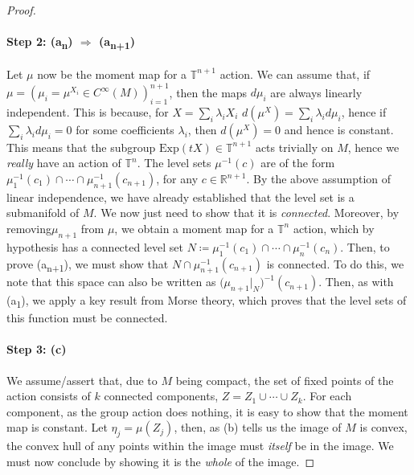 \documentclass[11pt, final]{article}
\begin{document}
\begin{proof}
	\paragraph{Step 2: (a\textsubscript{n}) $ \Rightarrow $ (a\textsubscript{n+1})} Let $ \mu $ now be the moment map for a $ \mathbb{T}^{n+1} $ action. We can assume that, if $ \mu = (\mu_i = \mu^{X_i} \in C^\infty (M))_{i=1}^{n+1} $, then the maps $ d\mu_i $ are always linearly independent. This is because, for $ X = \sum_i \lambda_i X_i $ $ d(\mu^X) = \sum_i \lambda_i d\mu_i $, hence if $ \sum_i \lambda_i d\mu_i = 0 $ for some coefficients $ \lambda_i $, then $ d(\mu^X) = 0 $ and hence is constant. This means that the subgroup $ \mathrm{Exp}( tX ) \in \mathbb{T}^{n+1}$ acts trivially on $ M $, hence we \textit{really} have an action of $ \mathbb{T}^n $. The level sets $ \mu^{-1}(c) $ are of the form $ \mu^{-1}_1(c_1) \cap \cdots \cap \mu^{-1}_{n+1}(c_{n+1}) $, for any $ c \in \mathbb{R}^{n+1} $. By the above assumption of linear independence, we have already established that the level set is a submanifold of $ M $. We now just need to show that it is \textit{connected}. Moreover, by removing$ \mu_{n+1} $ from $ \mu $, we obtain a moment map for a $ \mathbb{T}^n $ action, which by hypothesis has a connected level set $ N \coloneqq \mu_1^{-1}(c_1) \cap \cdots \cap \mu_n^{-1}(c_n) $. Then, to prove (a\textsubscript{n+1}), we must show that $ N \cap \mu^{-1}_{n+1}(c_{n+1}) $ is connected. To do this, we note that this space can also be written as $ \big(\mu_{n+1}|_N\big)^{-1}(c_{n+1}) $. Then, as with (a\textsubscript{1}), we apply a key result from Morse theory, which proves that the level sets of this function must be connected.
	
	\paragraph{Step 3: (c)} We assume/assert that, due to $ M $ being compact, the set of fixed points of the action consists of $ k $ connected components, $ Z = Z_1 \cup \cdots \cup Z_k $. For each component, as the group action does nothing, it is easy to show that the moment map is constant. Let $ \eta_j = \mu(Z_j) $, then, as (b) tells us the image of $ M $ is convex, the convex hull of any points within the image must \textit{itself} be in the image. We must now conclude by showing it is the \textit{whole} of the image.
	

\end{proof}
\end{document}

